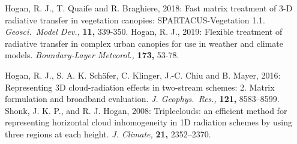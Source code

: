 \documentclass[a4,oneside]{article}
\begin{document}
\begin{thebibliography}{00}
%
Hogan, R. J., T. Quaife
and R. Braghiere, 2018: Fast matrix treatment of 3-D radiative
transfer in vegetation canopies: SPARTACUS-Vegetation
1.1. \textit{Geosci.\ Model Dev.,} \textbf{11,} 339-350.
%
Hogan, R. J., 2019: Flexible
treatment of radiative transfer in complex urban canopies for use in
weather and climate models. \textit{Boundary-Layer Meteorol.,}
\textbf{173,} 53-78.

%
%
Hogan, R. J.,
S. A. K. Sch\"afer, C. Klinger, J.-C. Chiu and B. Mayer, 2016:
Representing 3D cloud-radiation effects in two-stream schemes:
2. Matrix formulation and broadband
evaluation. \textit{J. Geophys.\ Res.,} \textbf{121,} 8583--8599.
%
%
Shonk, J. K. P., and
R. J. Hogan, 2008: Tripleclouds: an efficient method for representing
horizontal cloud inhomogeneity in 1D radiation schemes by using three
regions at each height. \textit{J. Climate,} \textbf{21,} 2352--2370.
%
\end{thebibliography}
\end{document}
